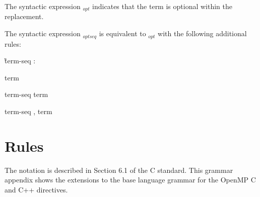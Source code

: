 The syntactic expression $_{opt}$ indicates that the term is optional within the 
replacement.

The syntactic expression $_{optseq}$ is equivalent to $_{opt}$ with the following 
additional rules:

{
\G term-seq :

\I term

\I term-seq term

\I term-seq , term
}




\pagebreak
\section{Rules}
\label{sec:Rules}
The notation is described in Section 6.1 of the C standard. This grammar appendix 
shows the extensions to the base language grammar for the OpenMP C and C++ 
directives.

